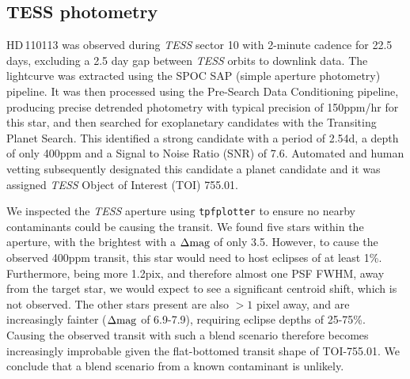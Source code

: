 \documentclass[fleqn,usenatbib]{mnras}
\newcommand{\tess}{{\it TESS}}
\newcommand{\Tstar}{HD\,110113}
\begin{document}
\subsection{TESS photometry}
\Tstar{} was observed during \tess{} sector 10 with 2-minute cadence for 22.5 days, excluding a 2.5 day gap between \tess{} orbits to downlink data.
The lightcurve was extracted using the SPOC \citep[Science Processing Operations Centre][]{jenkins2016tess} SAP (simple aperture photometry) pipeline.
It was then processed using the Pre-Search Data Conditioning \citep[PDC,][]{stumpe2012kepler} pipeline, producing precise detrended photometry with typical precision of 150ppm/hr for this star, and then searched for exoplanetary candidates with the Transiting Planet Search.
This identified a strong candidate with a period of 2.54d, a depth of only 400ppm and a Signal to Noise Ratio (SNR) of 7.6.
Automated and human vetting subsequently designated this candidate a planet candidate and it was assigned \tess{} Object of Interest (TOI) 755.01. 

We inspected the \tess{} aperture using \texttt{tpfplotter} \citep[plotted in Figure \ref{fig:tpf};][]{2020A&A...635A.128A} to ensure no nearby contaminants could be causing the transit.
We found five stars within the aperture, with the brightest with a $\Delta{\rm mag}$ of only 3.5.
However, to cause the observed 400ppm transit, this star would need to host eclipses of at least 1\%. 
Furthermore, being more 1.2pix, and therefore almost one PSF FWHM, away from the target star, we would expect to see a significant centroid shift, which is not observed.
The other stars present are also $\gt1$ pixel away, and are increasingly fainter ($\Delta{\rm mag}$ of 6.9-7.9), requiring eclipse depths of 25-75\%.
Causing the observed transit with such a blend scenario therefore becomes increasingly improbable given the flat-bottomed transit shape of TOI-755.01.
We conclude that a blend scenario from a known contaminant is unlikely.
\end{document}
